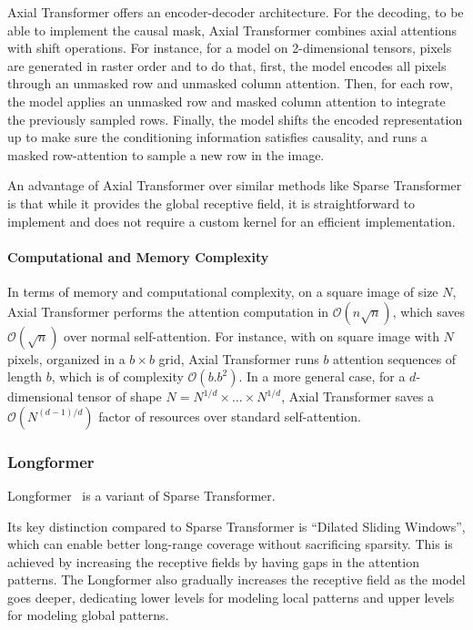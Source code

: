 Axial Transformer offers an encoder-decoder architecture. For the decoding, to be able to implement the causal mask, Axial Transformer combines axial attentions with shift operations. For instance, for a model on 2-dimensional tensors, pixels are generated in raster order and to do that, first, the model encodes all pixels through an unmasked row and unmasked column attention. Then, for each row, the model applies an unmasked row and masked column attention to integrate the previously sampled rows. Finally, the model shifts the encoded representation up to make sure the conditioning information satisfies causality, and runs a masked row-attention to sample a new row in the image.

An advantage of Axial Transformer over similar methods like Sparse Transformer is that while it provides the global receptive field, it is straightforward to implement and does not require a custom kernel for an efficient implementation.  

\paragraph{Computational and Memory Complexity} In terms of memory and computational complexity, on a square image of size $N$, Axial Transformer performs the attention computation in $\mathcal{O}(n \sqrt{n})$, which saves   $\mathcal{O}(\sqrt{n})$ over normal self-attention. For instance, with on square image with $N$ pixels, organized in a $b\times b$ grid, Axial Transformer runs $b$ attention sequences of length $b$,  which is of complexity $\mathcal{O}(b.b^2)$. In a more general case, for a $d$-dimensional tensor of shape $N = N^{1/d}\times \ldots \times N^{1/d }$, Axial Transformer saves a  $\mathcal{O}(N^{(d-1)/d})$ factor of resources over standard self-attention.

\subsubsection{Longformer}
Longformer~\citep{beltagy2020longformer} is a variant of Sparse Transformer. 

Its key distinction compared to Sparse Transformer is ``Dilated Sliding Windows'', which can enable better long-range coverage without sacrificing sparsity. This is achieved by increasing the receptive fields by having gaps in the attention patterns. The Longformer also gradually increases the receptive field as the model goes deeper, dedicating lower levels for modeling local patterns and upper levels for modeling global patterns. 
